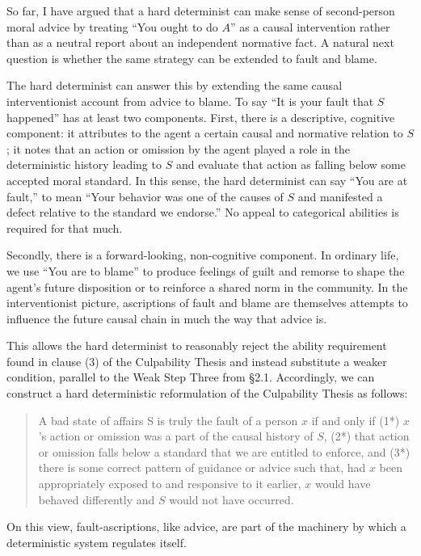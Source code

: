 So far, I have argued that a hard determinist can make sense of
second-person moral advice by treating ``You ought to do $A$'' as a causal
intervention rather than as a neutral report about an independent
normative fact. A natural next question is whether the same strategy can
be extended to fault and blame.

The hard determinist can answer this by extending the same causal
interventionist account from advice to blame. To say ``It is your fault
that $S$ happened'' has at least two components. First, there is a
descriptive, cognitive component: it attributes to the agent a certain
causal and normative relation to $S$; it notes that an action or omission
by the agent played a role in the deterministic history leading to $S$ and
evaluate that action as falling below some accepted moral standard. In
this sense, the hard determinist can say ``You are at fault,'' to mean
``Your behavior was one of the causes of $S$ and manifested a defect
relative to the standard we endorse.'' No appeal to categorical
abilities is required for that much.

Secondly, there is a forward-looking, non-cognitive component. In
ordinary life, we use ``You are to blame'' to produce feelings of guilt
and remorse to shape the agent's future disposition or to reinforce a
shared norm in the community. In the interventionist picture,
ascriptions of fault and blame are themselves attempts to influence the
future causal chain in much the way that advice is.

This allows the hard determinist to reasonably reject the ability
requirement found in clause (3) of the Culpability Thesis and instead
substitute a weaker condition, parallel to the Weak Step Three from
§2.1. Accordingly, we can construct a hard deterministic reformulation
of the Culpability Thesis as follows:

\vspace{-1em}
\begin{quote}
A bad state of affairs S is truly the fault of a person $x$ if and only if
(1*) $x$'s action or omission was a part of the causal history of $S$, (2*)
that action or omission falls below a standard that we are entitled to
enforce, and (3*) there is some correct pattern of guidance or advice
such that, had $x$ been appropriately exposed to and responsive to it
earlier, $x$ would have behaved differently and $S$ would not have occurred.
\end{quote}

\noindent On this view, fault-ascriptions, like advice, are part of the machinery
by which a deterministic system regulates itself.

